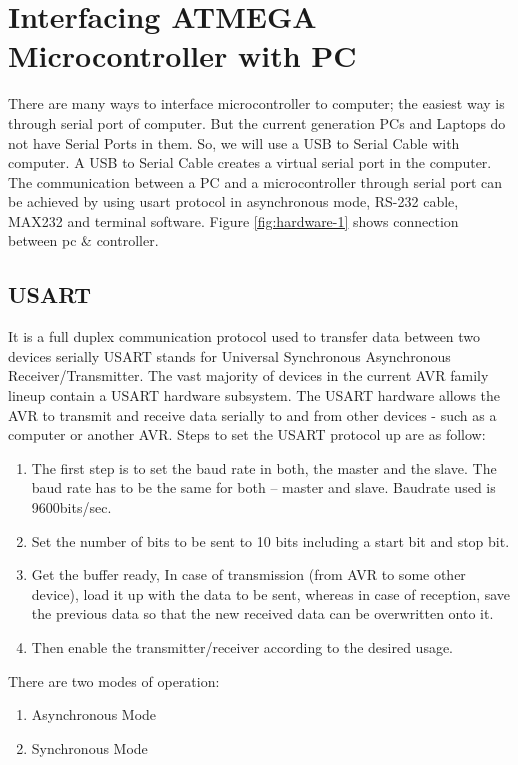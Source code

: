 \documentclass[12pt, a4paper, twoside]{report}
\begin{document}
\section{Interfacing ATMEGA Microcontroller with PC}
There are many ways to interface microcontroller to computer; the easiest way is through serial port of computer. But the current generation PCs and Laptops do not have Serial Ports in them. So, we will use a USB to Serial Cable with computer. A USB to Serial Cable creates a virtual serial port in the computer. The communication between a PC and a microcontroller through serial port can be achieved by using \acrshort{usart} protocol in asynchronous mode, RS-232 cable, MAX232 and terminal software. Figure \ref{fig:hardware-1} shows connection between pc \& controller.
\subsection{USART}
It is a full duplex communication protocol used to transfer data between two devices serially USART stands for Universal Synchronous Asynchronous Receiver/Transmitter. The vast majority of devices in the current AVR family lineup contain a USART hardware subsystem. The USART hardware allows the AVR to transmit and receive data serially to and from other devices - such as a computer or another AVR. Steps to set the USART protocol up are as follow:
\begin{enumerate}[noitemsep]
\item The first step is to set the baud rate in both, the master and the slave. The baud rate has to be the same for both – master and slave. Baudrate used is 9600bits/sec.
\item Set the number of bits to be sent to 10 bits including a start bit and stop bit.
\item Get the buffer ready, In case of transmission (from AVR to some other device), load it up with the data to be sent, whereas in case of reception, save the previous data so that the new received data can be overwritten onto it.
\item Then enable the transmitter/receiver according to the desired usage.
\end{enumerate}
There are two modes of operation:
\begin{enumerate}[noitemsep]
\item Asynchronous Mode 
\item Synchronous Mode
\end{enumerate}
\end{document}
